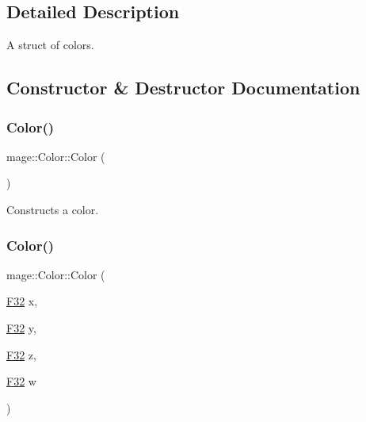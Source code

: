 \subsection{Detailed Description}
A struct of colors. 

\subsection{Constructor \& Destructor Documentation}
\hypertarget{structmage_1_1_color_a542f26c61d9c67098302b0262c518758}{}\label{structmage_1_1_color_a542f26c61d9c67098302b0262c518758} 
\subsubsection{\texorpdfstring{Color()}{Color()}\hspace{0.1cm}{\footnotesize\ttfamily [1/6]}}
{\footnotesize\ttfamily mage\+::\+Color\+::\+Color (\begin{DoxyParamCaption}{ }\end{DoxyParamCaption})\hspace{0.3cm}{\ttfamily [noexcept]}}

Constructs a color. \hypertarget{structmage_1_1_color_a9f13bfcd7da083cd49ebcf4d24397e83}{}\label{structmage_1_1_color_a9f13bfcd7da083cd49ebcf4d24397e83} 
\subsubsection{\texorpdfstring{Color()}{Color()}\hspace{0.1cm}{\footnotesize\ttfamily [2/6]}}
{\footnotesize\ttfamily mage\+::\+Color\+::\+Color (\begin{DoxyParamCaption}\item[{\hyperlink{namespacemage_aa97e833b45f06d60a0a9c4fc22ae02c0}{F32}}]{x,  }\item[{\hyperlink{namespacemage_aa97e833b45f06d60a0a9c4fc22ae02c0}{F32}}]{y,  }\item[{\hyperlink{namespacemage_aa97e833b45f06d60a0a9c4fc22ae02c0}{F32}}]{z,  }\item[{\hyperlink{namespacemage_aa97e833b45f06d60a0a9c4fc22ae02c0}{F32}}]{w }\end{DoxyParamCaption})\hspace{0.3cm}{\ttfamily [noexcept]}}

